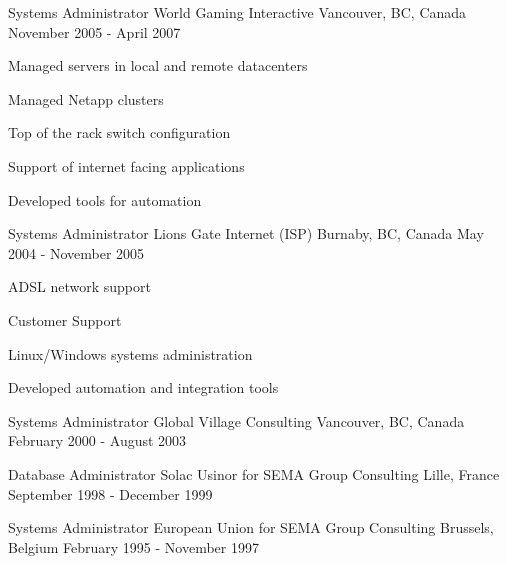 \begin{cventries}
  \cventry
    {Systems Administrator} %
    {World Gaming Interactive} %
    {Vancouver, BC, Canada} %
    {November 2005 - April 2007} %
    {
      \begin{cvitems} %
        \item {Managed servers in local and remote datacenters}
        \item {Managed Netapp clusters}
        \item {Top of the rack switch configuration}
        \item {Support of internet facing applications}
        \item {Developed tools for automation}
      \end{cvitems}
    }

  \cventry
    {Systems Administrator} %
    {Lions Gate Internet (ISP)} %
    {Burnaby, BC, Canada} %
    {May 2004 - November 2005} %
    {
      \begin{cvitems} %
        \item {ADSL network support}
        \item {Customer Support}
        \item {Linux/Windows systems administration}
        \item {Developed automation and integration tools}
      \end{cvitems}
    }

  \cventry
    {Systems Administrator} %
    {Global Village Consulting} %
    {Vancouver, BC, Canada} %
    {February 2000 - August 2003} %
    {
      \begin{cvitems} %
      \end{cvitems}
    }

\cventry
{Database Administrator} %
{Solac Usinor for SEMA Group Consulting} %
{Lille, France} %
{September 1998 - December 1999} %
{
  \begin{cvitems} %
  \end{cvitems}
}


\cventry
{Systems Administrator} %
{European Union for SEMA Group Consulting} %
{Brussels, Belgium} %
{February 1995 - November 1997} %
{
  \begin{cvitems} %
  \end{cvitems}
}
\end{cventries}

